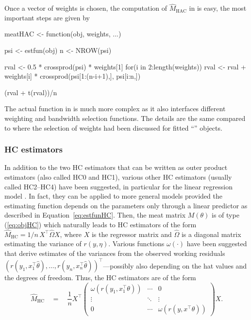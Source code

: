 \documentclass{Z}
\begin{document}
Once a vector of weights is chosen, the computation of $\hat M_\mathrm{HAC}$ in 
is easy, the most important steps are given by
\begin{Schunk}
\begin{Sinput}
meatHAC <- function(obj, weights, ...)
{
  psi <- estfun(obj)
  n <- NROW(psi)

  rval <- 0.5 * crossprod(psi) * weights[1]
  for(i in 2:length(weights))
    rval <- rval + weights[i] * crossprod(psi[1:(n-i+1),], psi[i:n,])
  
  (rval + t(rval))/n
}
\end{Sinput}
\end{Schunk}
The actual function  in  is much more complex as it also 
interfaces different weighting and bandwidth selection functions. The details are the same
compared to \cite{hac:Zeileis:2004a} where the selection of weights had been discussed for
fitted ``'' objects.


\subsubsection{HC estimators}

In addition to the two HC estimators that can be written as outer product
estimators (also called HC0 and HC1), various other HC estimators (usually
called HC2--HC4) have been suggested, in particular for the linear regression
model \citep{hac:MacKinnon+White:1985,hac:Long+Ervin:2000,hac:Cribari-Neto:2004}.
In fact, they can be applied to more general models provided the estimating
function depends on the parameters only through a linear predictor as
described in Equation~\ref{eq:estfunHC}. Then, the meat matrix $M(\theta)$ is
of type (\ref{eq:objHC}) which naturally leads to HC estimators of the form
$\hat M_\mathrm{HC} = 1/n \, X^\top \hat \Omega X$, where $X$
is the regressor matrix and $\hat \Omega$ is a diagonal matrix estimating the variance of $r(y, \eta)$.
Various functions $\omega(\cdot)$ have been suggested that derive estimates of
the variances from the observed working residuals
$(r(y_1, x_1^\top \hat \theta), \dots, r(y_n, x_n^\top \hat \theta))^\top$---possibly 
also depending on
the hat values and the degrees of freedom. Thus, the HC estimators are of the form
\begin{equation} \label{eq:meatHC}
\hat M_\mathrm{HC} \quad = \quad \frac{1}{n} X^\top \left( \begin{array}{ccc} 
  \omega(r(y_1, x_1^\top \theta)) & \cdots & 0 \\
  \vdots & \ddots & \vdots \\
  0 & \cdots & \omega(r(y, x^\top \theta))
  \end{array} \right) X.
\end{equation}
\end{document}
